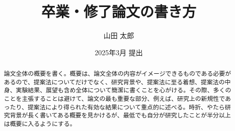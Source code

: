 \documentclass[11pt,a4paper,twoside,openany]{book}
\title{卒業・修了論文の書き方}
\author{山田 太郎}  %
\affiliation{一橋大学ソーシャル・データサイエンス研究科}
\date{2025年3月 提出}
\begin{document}
\frontmatter
\maketitle

\begin{abstract}
  論文全体の概要を書く。概要は、論文全体の内容がイメージできるものである必要があるので、提案法についてだけでなく、研究背景や、提案法に至る着想、提案法の中身、実験結果、展望も含め全体について簡潔に書くことを心がける。その際、多くのことを主張することは避けて、論文の最も重要な部分、例えば、研究上の新規性であったり、提案法により得られた有効な結果について重点的に述べる。時折、やたら研究背景が長く書いてある概要を見かけるが、最低でも自分が研究したことが半分以上は概要に入るようにする。
\end{abstract}

\tableofcontents  %
\clearpage

\listoffigures    %
\clearpage

\listoftables     %
\clearpage

\mainmatter








\begin{acks}

\end{acks}



% 
% 

\printbibliography[title=\biblioname,heading=bibintoc]


\begin{appendices}
  
\end{appendices}

\end{document}
